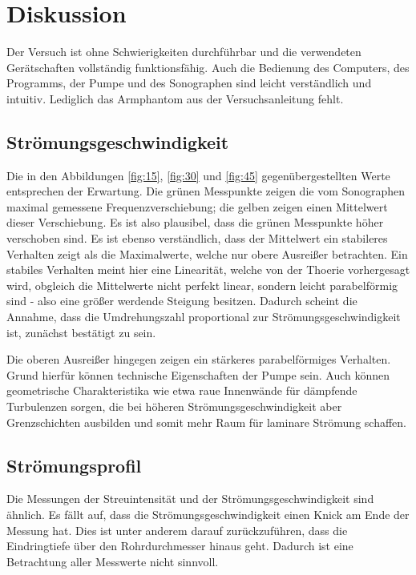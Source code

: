 \section{Diskussion}
\label{sec:Diskussion}

Der Versuch ist ohne Schwierigkeiten durchführbar und die verwendeten Gerätschaften vollständig funktionsfähig.
Auch die Bedienung des Computers, des Programms, der Pumpe und des Sonographen sind leicht verständlich und intuitiv.
Lediglich das Armphantom aus der Versuchsanleitung fehlt.

\subsection{Strömungsgeschwindigkeit}
Die in den Abbildungen \ref{fig:15}, \ref{fig:30} und \ref{fig:45} gegenübergestellten Werte entsprechen der Erwartung.
Die grünen Messpunkte zeigen die vom Sonographen maximal gemessene Frequenzverschiebung; die gelben zeigen einen Mittelwert dieser Verschiebung.
Es ist also plausibel, dass die grünen Messpunkte höher verschoben sind. Es ist ebenso verständlich, dass der Mittelwert ein stabileres Verhalten zeigt als die Maximalwerte,
welche nur obere Ausreißer betrachten. Ein stabiles Verhalten meint hier eine Linearität, welche von der Thoerie vorhergesagt wird, obgleich die Mittelwerte nicht perfekt linear, sondern
leicht parabelförmig sind - also eine größer werdende Steigung besitzen. Dadurch scheint die Annahme, dass die Umdrehungszahl proportional
zur Strömungsgeschwindigkeit ist, zunächst bestätigt zu sein.

Die oberen Ausreißer hingegen zeigen ein stärkeres parabelförmiges Verhalten. Grund hierfür können technische Eigenschaften der Pumpe sein.
Auch können geometrische Charakteristika wie etwa raue Innenwände für dämpfende Turbulenzen sorgen, die bei höheren Strömungsgeschwindigkeit aber Grenzschichten ausbilden und somit
mehr Raum für laminare Strömung schaffen.

\subsection{Strömungsprofil}
Die Messungen der Streuintensität und der Strömungsgeschwindigkeit sind ähnlich. Es fällt auf, dass die Strömungsgeschwindigkeit einen Knick am Ende der Messung hat. Dies ist unter
anderem darauf zurückzuführen, dass die Eindringtiefe über den Rohrdurchmesser hinaus geht. Dadurch ist eine Betrachtung aller Messwerte nicht sinnvoll.

